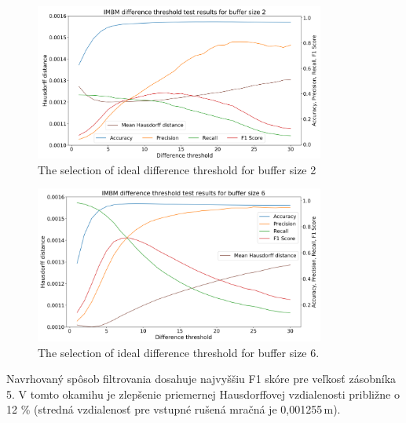 \begin{figure}[H]
	\centering
	\includegraphics[width=0.85\textwidth]{figures/imbm_th_2.png}
	\caption{The selection of ideal difference threshold for buffer size 2}
	\label{fig:imbmth:a}
\end{figure}

\begin{figure}[H]
	\centering
	\includegraphics[width=0.85\textwidth]{figures/imbm_th_6.png}
	\caption{The selection of ideal difference threshold for buffer size 6.}
	\label{fig:imbmth:b}
\end{figure}

Navrhovaný spôsob filtrovania dosahuje najvyššiu F1 skóre pre veľkosť zásobníka 5. V tomto okamihu je zlepšenie priemernej Hausdorffovej vzdialenosti približne o 12 \% (stredná vzdialenosť pre vstupné rušená mračná je 0,001255\,m).


